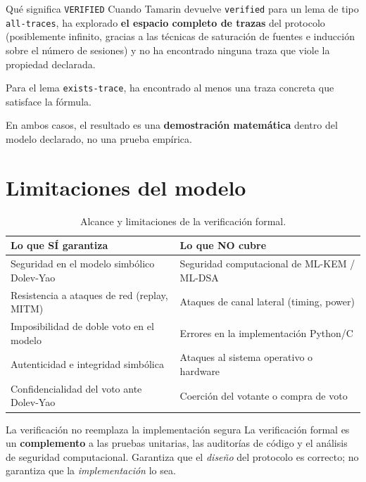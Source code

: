 \documentclass[12pt, a4paper, twoside, openright]{book}
\begin{document}
\bigskip

\begin{cajaDef}{Qu\'e significa \texttt{VERIFIED}}
  Cuando Tamarin devuelve \texttt{verified} para un lema de tipo
  \texttt{all-traces}, ha explorado \textbf{el espacio completo de
  trazas} del protocolo (posiblemente infinito, gracias a las t\'ecnicas
  de saturaci\'on de fuentes e inducci\'on sobre el n\'umero de sesiones)
  y no ha encontrado ninguna traza que viole la propiedad declarada.

  Para el lema \texttt{exists-trace}, ha encontrado al menos una traza
  concreta que satisface la f\'ormula.

  En ambos casos, el resultado es una \textbf{demostraci\'on matem\'atica}
  dentro del modelo declarado, no una prueba emp\'irica.
\end{cajaDef}

\section{Limitaciones del modelo}

\begin{table}[H]
\centering
\caption{Alcance y limitaciones de la verificaci\'on formal.}
\label{tab:limites}
\begin{tabularx}{\textwidth}{X X}
\toprule
\textbf{Lo que S\'I garantiza} & \textbf{Lo que NO cubre} \\
\midrule
Seguridad en el modelo simb\'olico Dolev-Yao &
  Seguridad computacional de ML-KEM / ML-DSA \\[4pt]
Resistencia a ataques de red (replay, MITM) &
  Ataques de canal lateral (timing, power) \\[4pt]
Imposibilidad de doble voto en el modelo &
  Errores en la implementaci\'on Python/C \\[4pt]
Autenticidad e integridad simb\'olica &
  Ataques al sistema operativo o hardware \\[4pt]
Confidencialidad del voto ante Dolev-Yao &
  Coerci\'on del votante o compra de voto \\
\bottomrule
\end{tabularx}
\end{table}

\begin{cajaAviso}{La verificaci\'on no reemplaza la implementaci\'on segura}
  La verificaci\'on formal es un \textbf{complemento} a las pruebas
  unitarias, las auditor\'ias de c\'odigo y el an\'alisis de seguridad
  computacional. Garantiza que el \textit{dise\~no} del protocolo es
  correcto; no garantiza que la \textit{implementaci\'on} lo sea.
\end{cajaAviso}
\end{document}
